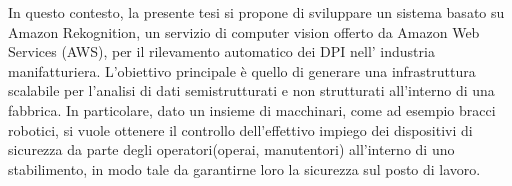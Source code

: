 In questo contesto, la presente tesi si propone di sviluppare un sistema basato su Amazon Rekognition, un servizio di computer vision offerto da Amazon Web Services (AWS), per il rilevamento automatico dei DPI nell' industria manifatturiera. L'obiettivo principale è quello di generare una infrastruttura scalabile per l’analisi di dati semistrutturati e non strutturati all’interno di una fabbrica. In particolare, dato un insieme di macchinari, come ad esempio bracci robotici, si vuole ottenere il controllo dell’effettivo impiego dei dispositivi di sicurezza da parte degli operatori(operai, manutentori) all'interno di uno stabilimento, in modo tale da garantirne loro la sicurezza sul posto di lavoro.
